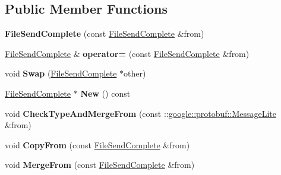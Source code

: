 \subsection*{Public Member Functions}
\begin{DoxyCompactItemize}
\item 
\mbox{\label{classruntime_1_1FileSendComplete_a21bd78bbf6d5d57a3f66ee0f8a5fefe3}} 
{\bfseries File\+Send\+Complete} (const \hyperlink{classruntime_1_1FileSendComplete}{File\+Send\+Complete} \&from)
\item 
\mbox{\label{classruntime_1_1FileSendComplete_a5590cf029544a87a8532aa06867e7492}} 
\hyperlink{classruntime_1_1FileSendComplete}{File\+Send\+Complete} \& {\bfseries operator=} (const \hyperlink{classruntime_1_1FileSendComplete}{File\+Send\+Complete} \&from)
\item 
\mbox{\label{classruntime_1_1FileSendComplete_aa583c6ec35602d313f8c05bce5481e4e}} 
void {\bfseries Swap} (\hyperlink{classruntime_1_1FileSendComplete}{File\+Send\+Complete} $\ast$other)
\item 
\mbox{\label{classruntime_1_1FileSendComplete_adf3e62f2945463c22f6a982ce2e13c55}} 
\hyperlink{classruntime_1_1FileSendComplete}{File\+Send\+Complete} $\ast$ {\bfseries New} () const
\item 
\mbox{\label{classruntime_1_1FileSendComplete_ade3f5a821342fc8a6a5f6a9e344433dc}} 
void {\bfseries Check\+Type\+And\+Merge\+From} (const \+::\hyperlink{classgoogle_1_1protobuf_1_1MessageLite}{google\+::protobuf\+::\+Message\+Lite} \&from)
\item 
\mbox{\label{classruntime_1_1FileSendComplete_a611db0e48f55dd4ccbd1698b55965903}} 
void {\bfseries Copy\+From} (const \hyperlink{classruntime_1_1FileSendComplete}{File\+Send\+Complete} \&from)
\item 
\mbox{\label{classruntime_1_1FileSendComplete_a9cd7b59331751382d2fbf9820019adfb}} 
void {\bfseries Merge\+From} (const \hyperlink{classruntime_1_1FileSendComplete}{File\+Send\+Complete} \&from)

\end{DoxyCompactItemize}
